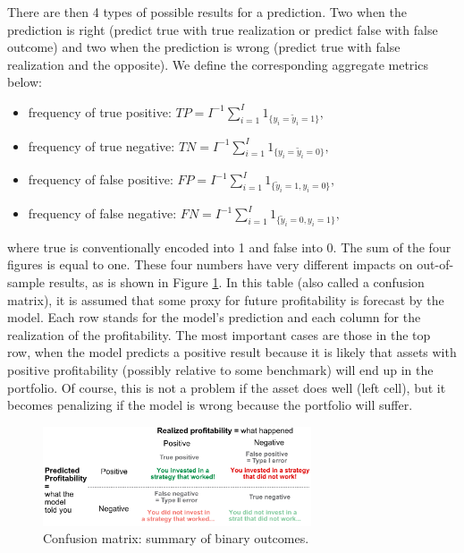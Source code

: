 \documentclass[]{krantz}
\providecommand{\tightlist}{%
  \setlength{\itemsep}{0pt}\setlength{\parskip}{0pt}}
\theoremstyle{definition}
\theoremstyle{definition}
\theoremstyle{definition}
\theoremstyle{remark}
\begin{document}
There are then 4 types of possible results for a prediction. Two when
the prediction is right (predict true with true realization or predict
false with false outcome) and two when the prediction is wrong (predict
true with false realization and the opposite). We define the
corresponding aggregate metrics below:

\begin{itemize}
\tightlist
\item
  frequency of true positive:
  \(TP=I^{-1}\sum_{i=1}^I1_{\{y_i=\tilde{y}_i=1 \}},\)\\
\item
  frequency of true negative:
  \(TN=I^{-1}\sum_{i=1}^I1_{\{y_i=\tilde{y}_i=0 \}},\)\\
\item
  frequency of false positive:
  \(FP=I^{-1}\sum_{i=1}^I1_{\{\tilde{y}_i=1,y_i=0 \}},\)\\
\item
  frequency of false negative:
  \(FN=I^{-1}\sum_{i=1}^I1_{\{\tilde{y}_i=0,y_i=1 \}},\)
\end{itemize}

where true is conventionally encoded into 1 and false into 0. The sum of
the four figures is equal to one. These four numbers have very different
impacts on out-of-sample results, as is shown in Figure
\ref{fig:valconfusion}. In this table (also called a confusion matrix),
it is assumed that some proxy for future profitability is forecast by
the model. Each row stands for the model's prediction and each column
for the realization of the profitability. The most important cases are
those in the top row, when the model predicts a positive result because
it is likely that assets with positive profitability (possibly relative
to some benchmark) will end up in the portfolio. Of course, this is not
a problem if the asset does well (left cell), but it becomes penalizing
if the model is wrong because the portfolio will suffer.

\begin{figure}[H]

{\centering \includegraphics[width=300px]{images/confusion} 

}

\caption{Confusion matrix: summary of binary outcomes.}\label{fig:valconfusion}
\end{figure}
\end{document}

